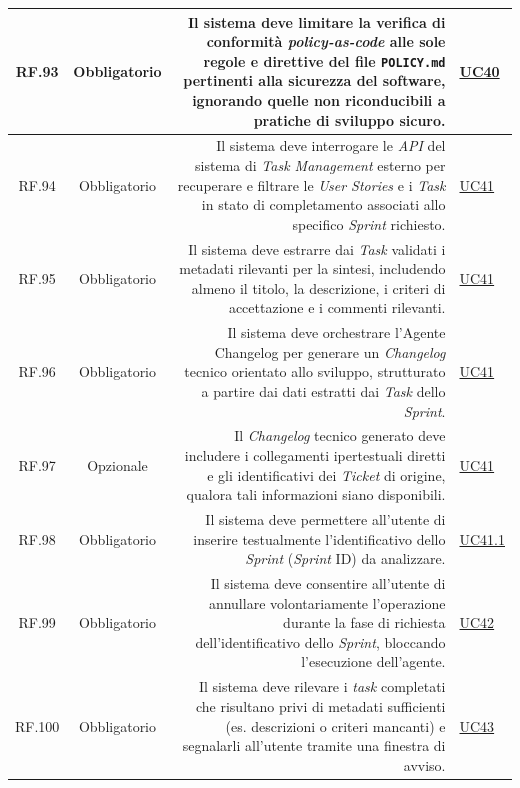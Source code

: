 \documentclass[12pt, a4paper]{article}
\begin{document}
\begin{xltabular}{\textwidth}{|c|c|D|F|}
    RF.93 & Obbligatorio & Il sistema deve limitare la verifica di conformità \textit{policy-as-code} alle sole regole e direttive del file \texttt{POLICY.md} pertinenti alla sicurezza del software, ignorando quelle non riconducibili a pratiche di sviluppo sicuro. & \hyperref[uc:40]{UC40} \\ \hline
    
    RF.94 & Obbligatorio & Il sistema deve interrogare le \textit{API} del sistema di \textit{Task Management} esterno per recuperare e filtrare le \textit{User Stories} e i \textit{Task} in stato di completamento associati allo specifico \textit{Sprint} richiesto. & \hyperref[uc:41]{UC41} \\ \hline
    
    RF.95 & Obbligatorio & Il sistema deve estrarre dai \textit{Task} validati i metadati rilevanti per la sintesi, includendo almeno il titolo, la descrizione, i criteri di accettazione e i commenti rilevanti. & \hyperref[uc:41]{UC41} \\ \hline
    
    RF.96 & Obbligatorio & Il sistema deve orchestrare l'Agente Changelog per generare un \textit{Changelog} tecnico orientato allo sviluppo, strutturato a partire dai dati estratti dai \textit{Task} dello \textit{Sprint}. & \hyperref[uc:41]{UC41} \\ \hline
    
    RF.97 & Opzionale & Il \textit{Changelog} tecnico generato deve includere i collegamenti ipertestuali diretti e gli identificativi dei \textit{Ticket} di origine, qualora tali informazioni siano disponibili. & \hyperref[uc:41]{UC41} \\ \hline
    
    RF.98 & Obbligatorio & Il sistema deve permettere all'utente di inserire testualmente l'identificativo dello \textit{Sprint} (\textit{Sprint} ID) da analizzare. & \hyperref[uc:41.1]{UC41.1} \\ \hline
    
    RF.99 & Obbligatorio & Il sistema deve consentire all'utente di annullare volontariamente l'operazione durante la fase di richiesta dell'identificativo dello \textit{Sprint}, bloccando l'esecuzione dell'agente. & \hyperref[uc:42]{UC42} \\ \hline
    
    RF.100 & Obbligatorio & Il sistema deve rilevare i \textit{task} completati che risultano privi di metadati sufficienti (es. descrizioni o criteri mancanti) e segnalarli all'utente tramite una finestra di avviso. & \hyperref[uc:43]{UC43} \\ \hline
    

\end{xltabular}
\end{document}
